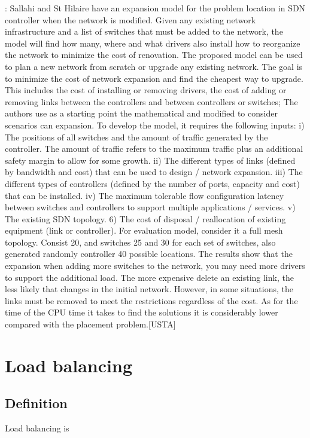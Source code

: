 \documentclass[a4paper,10pt]{article}
\begin{document}
\cite{SaHi17}: Sallahi and St Hilaire have an expansion model for the problem location in SDN controller when the network is modified. Given any existing network infrastructure and a list of switches that must be added to the network, the model will find how many, where and what drivers also install how to reorganize the network to minimize the cost of renovation. The proposed model can be used to plan a new network from scratch or upgrade any existing network. The goal is to minimize the cost of network expansion and find the cheapest way to upgrade. This includes the cost of installing or removing drivers, the cost of adding or removing links between the controllers and between controllers or switches;
The authors use as a starting point the mathematical and modified to consider scenarios can expansion. To develop the model, it requires the following inputs: i) The positions of all switches and the amount of traffic generated by the controller. The amount of traffic refers to the maximum traffic plus an additional safety margin to allow for some growth. ii) The different types of links (defined by bandwidth and cost) that can be used to design / network expansion. iii) The different types of controllers (defined by the number of ports, capacity and cost) that can be installed. iv) The maximum tolerable flow configuration latency between switches and controllers to support multiple applications / services. v) The existing SDN topology.
6) The cost of disposal / reallocation of existing equipment (link or controller).
For evaluation model, consider it a full mesh topology. Consist 20, and switches 25 and 30 for each set of switches, also generated randomly controller 40 possible locations. The results show that the expansion when adding more switches to the network, you may need more drivers to support the additional load. The more expensive delete an existing link, the less likely that changes in the initial network. However, in some situations, the links must be removed to meet the restrictions regardless of the cost. As for the time of the CPU time it takes to find the solutions it is considerably lower compared with the placement problem.[USTA]



\section{Load balancing}
\subsection{Definition}
Load balancing is
\end{document}
